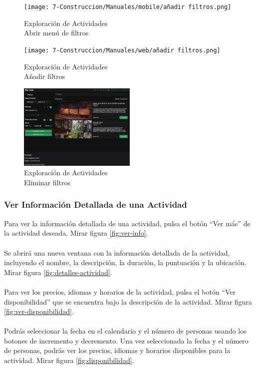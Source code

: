 \begin{figure}[H]
	\centering
	\begin{minipage}{0.45\textwidth}
		\centering
		\texttt{[image: 7-Construccion/Manuales/mobile/añadir filtros.png]}
		\caption{Exploración de Actividades \\ Abrir menú de filtros}
		\label{fig:filtros-movil}
	\end{minipage}
	\hfill
	\begin{minipage}{0.45\textwidth}
		\centering
		\texttt{[image: 7-Construccion/Manuales/web/añadir filtros.png]}
		\caption{Exploración de Actividades \\ Añadir filtros}
		\label{fig:añadir-filtros}
	\end{minipage}
\end{figure}

\begin{figure}[H]
	\centering
	\includegraphics[width=0.5\textwidth]{7-Construccion/Manuales/web/eliminar filtros.png}
	\caption{Exploración de Actividades \\ Eliminar filtros}
	\label{fig:eliminar-filtros}
\end{figure}


\subsubsection{Ver Información Detallada de una Actividad}
Para ver la información detallada de una actividad, pulsa el botón “Ver más” de la actividad deseada.
Mirar figura \ref{fig:ver-info}.
\\ \\[1ex]
Se abrirá una nueva ventana con la información detallada de la actividad, incluyendo el nombre, la descripción, la duración, la puntuación y la ubicación.
Mirar figura \ref{fig:detalles-actividad}.
\\ \\[1ex]
Para ver los precios, idiomas y horarios de la actividad, pulsa el botón “Ver disponibilidad” que se encuentra bajo la descripción de la actividad.
Mirar figura \ref{fig:ver-disponibilidad}.
\\ \\[1ex]
Podrás seleccionar la fecha en el calendario y el número de personas usando los botones de incremento y decremento.
Una vez seleccionada la fecha y el número de personas, podrás ver los precios, idiomas y horarios disponibles para la actividad.
Mirar figura \ref{fig:disponibilidad}.


